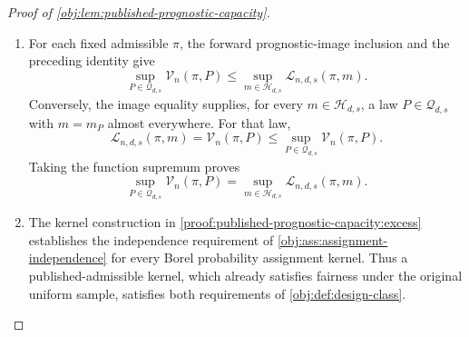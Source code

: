 \begin{proof}[Proof of \cref{obj:lem:published-prognostic-capacity}]
\begin{enumerate}
For any single-unit law \(P\) with bounded strictly positive covariate density and finite outcome second moments, the independent covariate sample law satisfies
\[
\operatorname{Law}_{P}\bigl((U_i)_{i=1}^n\bigr)
\ll \operatorname{Unif}([0,1]^d)^{\otimes n}.
\]
Hence the replacement preserves the entire experiment law:
\[
\operatorname{Law}_{P,\pi}\!\left(
(U_i,O_i(0),O_i(1))_{i=1}^n,Z\right)
=
\operatorname{Law}_{P,\pi^{\mathrm{fair}}}\!\left(
(U_i,O_i(0),O_i(1))_{i=1}^n,Z\right).
\]
Apply the published excess-variance identity
\citep[Proposition 2.3, equation (2.4), with Assumption 2.1 and Definition 2.2]{Cytrynbaum2026Limits}
to the pointwise fair replacement and transfer it through this equality. It gives
\[
\mathcal V_n(\pi,P)
=
\frac4n\,
\mathbb E_{P,\pi}
\left(\sum_{i=1}^n Z_i m_P(U_i)\right)^2
\geq0.
\]

Now take \(P\in\mathcal Q_{d,s}\), and choose \(m\in\mathcal H_{d,s}\) with \(m_P=m\) almost everywhere. Independence and uniformity of the unit covariates give
\[
\operatorname{Law}_{P,\pi}\bigl((U_i)_{i=1}^n,Z\bigr)
=
\operatorname{Unif}([0,1]^d)^{\otimes n}(dX)\,\pi(X,dZ).
\]
Moreover, the finite sample avoids the exceptional null set simultaneously:
\[
\Pr_{P,\pi}\!\left(
m_P(U_i)=m(U_i)\text{ for every }i
\right)=1.
\]
Square integrability of \(m\) makes the finite signed sum square integrable. Substituting the preceding two identities yields
\[
0\leq\mathcal V_n(\pi,P)
=\mathcal L_{n,d,s}(\pi,m_P)
=\mathcal L_{n,d,s}(\pi,m).
\]
This also proves invariance of the signing loss under the null representatives used here.

\item For each fixed admissible \(\pi\), the forward prognostic-image inclusion and the preceding identity give
\[
\sup_{P\in\mathcal Q_{d,s}}\mathcal V_n(\pi,P)
\leq
\sup_{m\in\mathcal H_{d,s}}\mathcal L_{n,d,s}(\pi,m).
\]
Conversely, the image equality supplies, for every \(m\in\mathcal H_{d,s}\), a law \(P\in\mathcal Q_{d,s}\) with \(m=m_P\) almost everywhere. For that law,
\[
\mathcal L_{n,d,s}(\pi,m)
=\mathcal V_n(\pi,P)
\leq
\sup_{P\in\mathcal Q_{d,s}}\mathcal V_n(\pi,P).
\]
Taking the function supremum proves
\[
\sup_{P\in\mathcal Q_{d,s}}\mathcal V_n(\pi,P)
=
\sup_{m\in\mathcal H_{d,s}}\mathcal L_{n,d,s}(\pi,m).
\]

\item The kernel construction in \cref{proof:published-prognostic-capacity:excess} establishes the independence requirement of \cref{obj:ass:assignment-independence} for every Borel probability assignment kernel. Thus a published-admissible kernel, which already satisfies fairness under the original uniform sample, satisfies both requirements of \cref{obj:def:design-class}.


\end{enumerate}
\end{proof}

